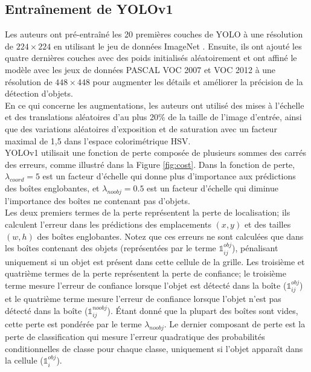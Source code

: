 \documentclass{article}
\begin{document}
\subsection{Entraînement de YOLOv1}

Les auteurs ont pré-entraîné les 20 premières couches de YOLO à une résolution de $224 \times 224$ en utilisant le jeu de données ImageNet \cite{43}. Ensuite, ils ont ajouté les quatre dernières couches avec des poids initialisés aléatoirement et ont affiné le modèle avec les jeux de données PASCAL VOC 2007 et VOC 2012 \cite{36} à une résolution de $448 \times 448$ pour augmenter les détails et améliorer la précision de la détection d'objets.
\vspace{0.2cm}\\
En ce qui concerne les augmentations, les auteurs ont utilisé des mises à l'échelle et des translations aléatoires d'au plus 20\% de la taille de l'image d'entrée, ainsi que des variations aléatoires d'exposition et de saturation avec un facteur maximal de 1,5 dans l'espace colorimétrique HSV.
\vspace{0.2cm}\\
YOLOv1 utilisait une fonction de perte composée de plusieurs sommes des carrés des erreurs, comme illustré dans la Figure \ref{fig:cost}. Dans la fonction de perte, $\lambda_{coord} = 5$ est un facteur d'échelle qui donne plus d'importance aux prédictions des boîtes englobantes, et $\lambda_{noobj} = 0.5$ est un facteur d'échelle qui diminue l'importance des boîtes ne contenant pas d'objets.
\vspace{0.2cm}\\
Les deux premiers termes de la perte représentent la perte de localisation; ils calculent l'erreur dans les prédictions des emplacements $(x, y)$ et des tailles $(w, h)$ des boîtes englobantes. Notez que ces erreurs ne sont calculées que dans les boîtes contenant des objets (représentées par le terme $\mathds{1}^{obj}_{ij}$), pénalisant uniquement si un objet est présent dans cette cellule de la grille. Les troisième et quatrième termes de la perte représentent la perte de confiance; le troisième terme mesure l'erreur de confiance lorsque l'objet est détecté dans la boîte ($\mathds{1}^{obj}_{ij}$) et le quatrième terme mesure l'erreur de confiance lorsque l'objet n'est pas détecté dans la boîte ($\mathds{1}^{noobj}_{ij}$). Étant donné que la plupart des boîtes sont vides, cette perte est pondérée par le terme $\lambda_{noobj}$. Le dernier composant de perte est la perte de classification qui mesure l'erreur quadratique des probabilités conditionnelles de classe pour chaque classe, uniquement si l'objet apparaît dans la cellule ($\mathds{1}^{obj}_i$).
\end{document}
